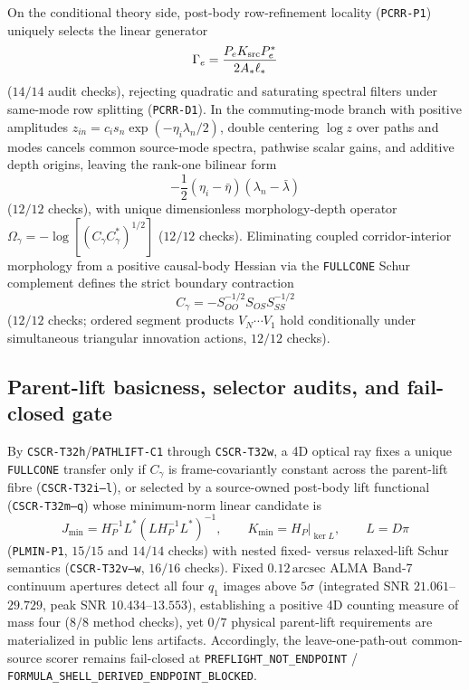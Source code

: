 \documentclass[11pt]{article}
\begin{document}
On the conditional theory side, post-body row-refinement locality
(\texttt{PCRR-P1}) uniquely selects the linear generator
\[
\Gamma_e=\frac{P_e K_{\rm src} P_e^*}{2A_*\ell_*}
\]
($14/14$ audit checks), rejecting quadratic and saturating spectral filters
under same-mode row splitting (\texttt{PCRR-D1}). In the commuting-mode branch
with positive amplitudes $z_{in}=c_i s_n\exp(-\eta_i\lambda_n/2)$, double
centering $\log z$ over paths and modes cancels common source-mode spectra,
pathwise scalar gains, and additive depth origins, leaving the rank-one bilinear
form
\[
-\frac{1}{2}(\eta_i-\bar\eta)(\lambda_n-\bar\lambda)
\]
($12/12$ checks), with unique dimensionless morphology-depth operator
$\Omega_\gamma=-\log[(C_\gamma C_\gamma^*)^{1/2}]$ ($12/12$ checks). Eliminating
coupled corridor-interior morphology from a positive causal-body Hessian via the
\texttt{FULLCONE} Schur complement defines the strict boundary contraction
\[
C_\gamma=-S_{OO}^{-1/2}S_{OS}S_{SS}^{-1/2}
\]
($12/12$ checks; ordered segment products $V_N\cdots V_1$ hold conditionally
under simultaneous triangular innovation actions, $12/12$ checks).

\subsection{Parent-lift basicness, selector audits, and fail-closed gate}

By \texttt{CSCR-T32h}/\texttt{PATHLIFT-C1} through \texttt{CSCR-T32w}, a 4D
optical ray fixes a unique \texttt{FULLCONE} transfer only if $C_\gamma$ is
frame-covariantly constant across the parent-lift fibre (\texttt{CSCR-T32i--l}),
or selected by a source-owned post-body lift functional (\texttt{CSCR-T32m--q})
whose minimum-norm linear candidate is
\[
J_{\min}=H_P^{-1}L^*(L H_P^{-1}L^*)^{-1},\qquad
K_{\min}=H_P|_{\ker L},\qquad L=D\pi
\]
(\texttt{PLMIN-P1}, $15/15$ and $14/14$ checks) with nested fixed- versus
relaxed-lift Schur semantics (\texttt{CSCR-T32v--w}, $16/16$ checks). Fixed
$0.12\,\mathrm{arcsec}$ ALMA Band-7 continuum apertures detect all four $q_1$
images above $5\sigma$ (integrated SNR $21.061$--$29.729$, peak SNR
$10.434$--$13.553$), establishing a positive 4D counting measure of mass four
($8/8$ method checks), yet $0/7$ physical parent-lift requirements are
materialized in public lens artifacts. Accordingly, the leave-one-path-out
common-source scorer remains fail-closed at
\texttt{PREFLIGHT\_NOT\_ENDPOINT} /
\texttt{FORMULA\_SHELL\_DERIVED\_ENDPOINT\_BLOCKED}.
\end{document}
